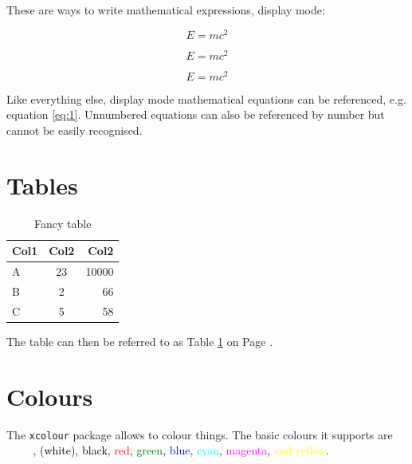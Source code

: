 \documentclass[12pt, letterpaper]{article} %
\begin{document}
These are ways to write mathematical expressions, display mode:

\begin{equation} \label{eq:1} %
E=mc^2
\end{equation}

\[E=mc^2\] %

\begin{displaymath} %
E=mc^2
\end{displaymath}


Like everything else, display mode mathematical equations can be referenced, e.g. equation \ref{eq:1}. Unnumbered equations can also be referenced by number but cannot be easily recognised.

\clearpage
\section{Tables} %

\begin{table}[h] %
	\centering %
	\begin{tabular}{|| l | c | r ||} %
		\hline %
		Col1 &	Col2 &	Col2	\\ \hline\hline %
		A	 &	23	 &	10000	\\ \hline
		B	 &	2	 &	66		\\ \hline
		C	 &	5	 &	58 		\\ [1ex] \hline %
	\end{tabular}
	\caption{Fancy table} %
	\label{table:data} %
\end{table}

The table can then be referred to as Table \ref{table:data} on Page \pageref{table:data}.

\section{Colours}

The \texttt{xcolour} package allows to colour things. The basic colours it supports are \textcolor{white}{white}, \textcolor{black}{(white), black}, \textcolor{red}{red}, \textcolor{green}{green}, \textcolor{blue}{blue}, \textcolor{cyan}{cyan}, \textcolor{magenta}{magenta}, \textcolor{yellow}{and yellow}.
\end{document}
